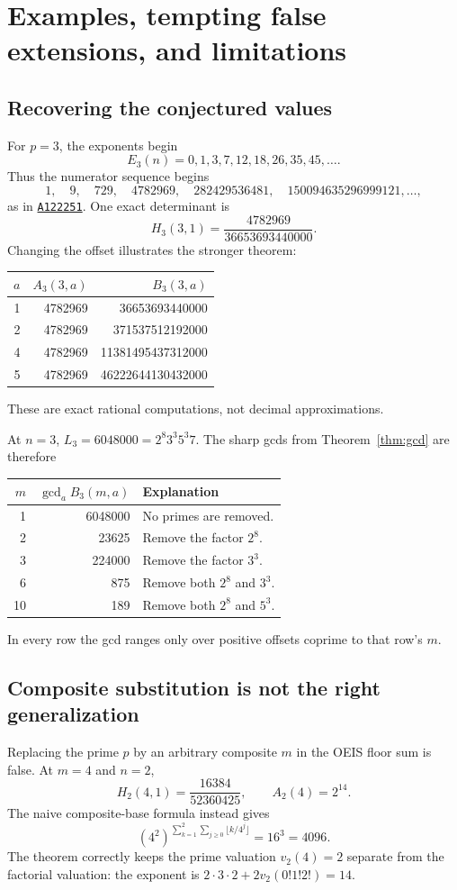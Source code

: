 \documentclass[11pt,a4paper]{article}
\numberwithin{equation}{section}
\theoremstyle{definition}
\theoremstyle{remark}
\newcommand{\OEIS}[1]{\href{https://oeis.org/#1}{\texttt{#1}}}
\begin{document}
\section{Examples, tempting false extensions, and limitations}\label{sec:examples}

\subsection{Recovering the conjectured values}
For $p=3$, the exponents begin
\[
 E_3(n)=0,1,3,7,12,18,26,35,45,\ldots.
\]
Thus the numerator sequence begins
\[
 1,\quad9,\quad729,\quad4782969,\quad282429536481,\quad
 150094635296999121,\ldots,
\]
as in \OEIS{A122251}. One exact determinant is
\[
 H_3(3,1)=\frac{4782969}{36653693440000}.
\]
Changing the offset illustrates the stronger theorem:
\begin{center}
\begin{tabular}{r r r}
\toprule
$a$ & $A_3(3,a)$ & $B_3(3,a)$\\
\midrule
1 & 4782969 & 36653693440000\\
2 & 4782969 & 371537512192000\\
4 & 4782969 & 11381495437312000\\
5 & 4782969 & 46222644130432000\\
\bottomrule
\end{tabular}
\end{center}
These are exact rational computations, not decimal approximations.

At $n=3$, $L_3=6048000=2^8 3^3 5^3 7$. The sharp gcds from Theorem~\ref{thm:gcd} are therefore
\begin{center}
\begin{tabular}{r r l}
\toprule
$m$ & $\gcd_a B_3(m,a)$ & Explanation\\
\midrule
1 & 6048000 & No primes are removed.\\
2 & 23625 & Remove the factor $2^8$.\\
3 & 224000 & Remove the factor $3^3$.\\
6 & 875 & Remove both $2^8$ and $3^3$.\\
10 & 189 & Remove both $2^8$ and $5^3$.\\
\bottomrule
\end{tabular}
\end{center}
In every row the gcd ranges only over positive offsets coprime to that row's $m$.

\subsection{Composite substitution is not the right generalization}
Replacing the prime $p$ by an arbitrary composite $m$ in the OEIS floor sum is false. At $m=4$ and $n=2$,
\[
 H_2(4,1)=\frac{16384}{52360425},\qquad A_2(4)=2^{14}.
\]
The naive composite-base formula instead gives
\[
 (4^2)^{\sum_{k=1}^2\sum_{j\geq0}\lfloor k/4^j\rfloor}
 =16^3=4096.
\]
The theorem correctly keeps the prime valuation $v_2(4)=2$ separate from the factorial valuation: the exponent is $2\cdot3\cdot2+2v_2(0!1!2!)=14$.
\end{document}
